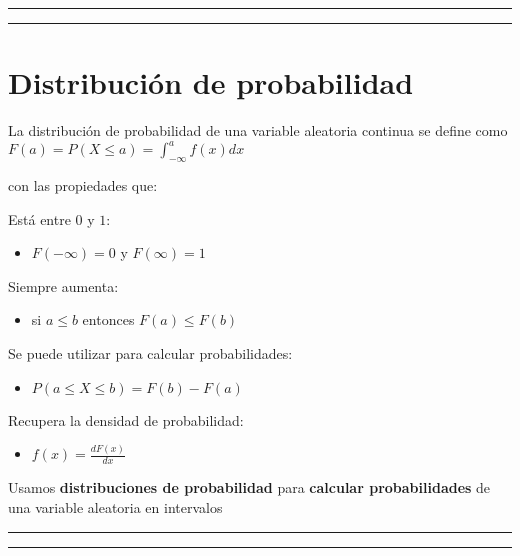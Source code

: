 \documentclass[
]{book}
\providecommand{\tightlist}{%
  \setlength{\itemsep}{0pt}\setlength{\parskip}{0pt}}
\begin{document}
\begin{center}\rule{0.5\linewidth}{0.5pt}\end{center}

\begin{center}\rule{0.5\linewidth}{0.5pt}\end{center}

\hypertarget{distribuciuxf3n-de-probabilidad-4}{%
\section{Distribución de probabilidad}\label{distribuciuxf3n-de-probabilidad-4}}

La distribución de probabilidad de una variable aleatoria continua se define como
\(F(a)=P(X\leq a) =\int_{-\infty} ^a f(x)dx\)

con las propiedades que:

Está entre \(0\) y \(1\):

\begin{itemize}
\tightlist
\item
  \(F(-\infty)= 0\) y \(F(\infty)=1\)
\end{itemize}

Siempre aumenta:

\begin{itemize}
\tightlist
\item
  si \(a\leq b\) entonces \(F(a)\leq F(b)\)
\end{itemize}

Se puede utilizar para calcular probabilidades:

\begin{itemize}
\tightlist
\item
  \(P(a \leq X \leq b)=F(b)-F(a)\)
\end{itemize}

Recupera la densidad de probabilidad:

\begin{itemize}
\tightlist
\item
  \(f(x)=\frac{dF(x)}{dx}\)
\end{itemize}

Usamos \textbf{distribuciones de probabilidad} para \textbf{calcular probabilidades} de una variable aleatoria en intervalos

\begin{center}\rule{0.5\linewidth}{0.5pt}\end{center}

\begin{center}\rule{0.5\linewidth}{0.5pt}\end{center}
\end{document}
